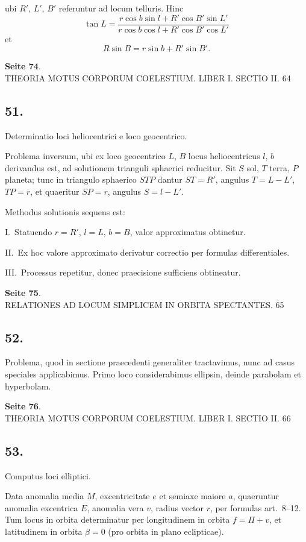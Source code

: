 \documentclass[12pt,a4paper]{article}
\begin{document}
ubi $R'$, $L'$, $B'$ referuntur ad locum telluris. Hinc
\[
\tan L = \frac{r \cos b \sin l + R' \cos B' \sin L'}{r \cos b \cos l + R' \cos B' \cos L'}
\]
et
\[
R \sin B = r \sin b + R' \sin B'.
\]

\textbf{Seite 74}.\\
THEORIA MOTUS CORPORUM COELESTIUM. LIBER I. SECTIO II. 64

\subsection*{51.}

Determinatio loci heliocentrici e loco geocentrico.

Problema inversum, ubi ex loco geocentrico $L$, $B$ locus heliocentricus $l$, $b$ derivandus est, ad solutionem trianguli sphaerici reducitur. Sit $S$ sol, $T$ terra, $P$ planeta; tunc in triangulo sphaerico $STP$ dantur $ST = R'$, angulus $T = L - L'$, $TP = r$, et quaeritur $SP = r$, angulus $S = l - L'$.

Methodus solutionis sequens est:

I.~Statuendo $r = R'$, $l = L$, $b = B$, valor approximatus obtinetur.

II.~Ex hoc valore approximato derivatur correctio per formulas differentiales.

III.~Processus repetitur, donec praecisione sufficiens obtineatur.

\textbf{Seite 75}.\\
RELATIONES AD LOCUM SIMPLICEM IN ORBITA SPECTANTES. 65

\subsection*{52.}

Problema, quod in sectione praecedenti generaliter tractavimus, nunc ad casus speciales applicabimus. Primo loco considerabimus ellipsin, deinde parabolam et hyperbolam.

\textbf{Seite 76}.\\
THEORIA MOTUS CORPORUM COELESTIUM. LIBER I. SECTIO II. 66

\subsection*{53.}

Computus loci elliptici.

Data anomalia media $M$, excentricitate $e$ et semiaxe maiore $a$, quaeruntur anomalia excentrica $E$, anomalia vera $v$, radius vector $r$, per formulas art.~8--12. Tum locus in orbita determinatur per longitudinem in orbita $f = \Pi + v$, et latitudinem in orbita $\beta = 0$ (pro orbita in plano eclipticae).
\end{document}
